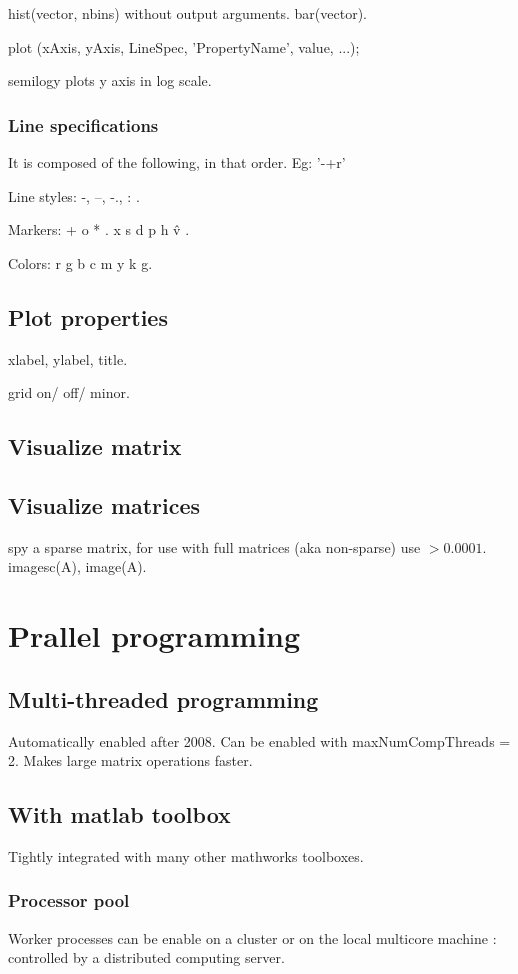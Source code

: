 \documentclass[oneside, article]{memoir}
\begin{document}
hist(vector, nbins) without output arguments. bar(vector).

plot (xAxis, yAxis, LineSpec, 'PropertyName', value, ...);

semilogy plots y axis in log scale.

\subsubsection{Line specifications}
It is composed of the following, in that order. Eg: '-+r'

Line styles: -, --, -., : .

Markers: + o * . x s d p h \^ v .

Colors: r g b c m y k g.


\subsection{Plot properties}
xlabel, ylabel, title.

grid on/ off/ minor.

\subsection{Visualize matrix}
\subsection{Visualize matrices}
spy a sparse matrix, for use with full matrices (aka non-sparse) use $>0.0001$. imagesc(A), image(A).

\section{Prallel programming}
\subsection{Multi-threaded programming}
Automatically enabled after 2008. Can be enabled with maxNumCompThreads = 2. Makes large matrix operations faster.

\subsection{With matlab toolbox}
Tightly integrated with many other mathworks toolboxes.

\subsubsection{Processor pool}
Worker processes can be enable on a cluster or on the local multicore machine : controlled by a distributed computing server.
\end{document}
